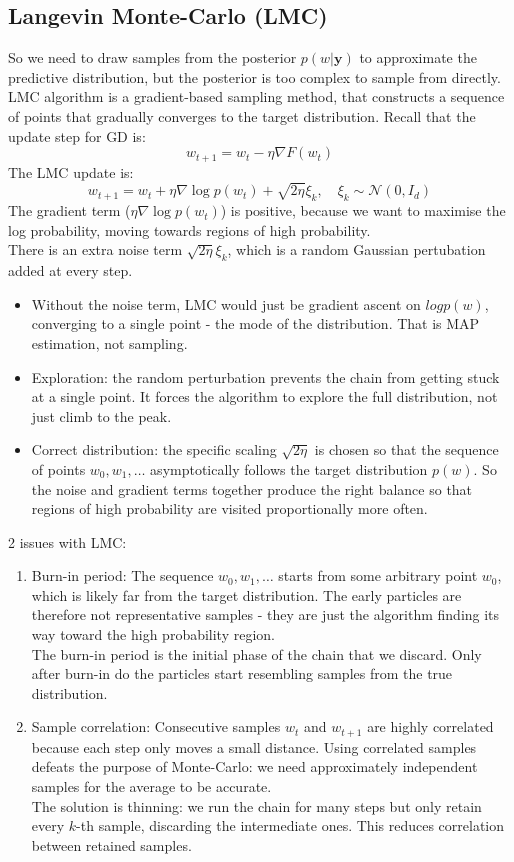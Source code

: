 \documentclass[../Probability.tex]{subfiles}
\begin{document}
\subsection{Langevin Monte-Carlo (LMC)}
So we need to draw samples from the posterior $p(w|\mathbf{y})$ to approximate the predictive distribution, but the posterior is too complex to sample from directly.
LMC algorithm is a gradient-based sampling method, that constructs a sequence of points that gradually converges to the target distribution.
Recall that the update step for GD is:
$$w_{t+1} = w_t - \eta\nabla F(w_t)$$
The LMC update is:
$$w_{t+1} = w_t + \eta\nabla\log p(w_t) + \sqrt{2\eta}\xi_k, \quad \xi_k \sim \mathcal{N}(0, I_d)$$
The gradient term ($\eta\nabla\log p(w_t)$) is positive, because we want to maximise the log probability, moving towards regions of high probability.\\
There is an extra noise term $\sqrt{2\eta}\xi_k$, which is a random Gaussian pertubation added at every step.
\begin{itemize}
    \item Without the noise term, LMC would just be gradient ascent on $log p(w)$, converging to a single point - the mode of the distribution. That is MAP estimation, not sampling.
    \item Exploration: the random perturbation prevents the chain from getting stuck at a single point. It forces the algorithm to explore the full distribution, not just climb to the peak.
    \item Correct distribution: the specific scaling $\sqrt{2\eta}$ is chosen so that the sequence of points $w_0,w_1,\ldots$ asymptotically follows the target distribution $p(w)$.
    So the noise and gradient terms together produce the right balance so that regions of high probability are visited proportionally more often.
\end{itemize}
2 issues with LMC:
\begin{enumerate}
    \item Burn-in period: The sequence $w_0, w_1, \ldots$ starts from some arbitrary point $w_0$, which is likely far from the target distribution.
    The early particles are therefore not representative samples - they are just the algorithm finding its way toward the high probability region.\\
    The burn-in period is the initial phase of the chain that we discard. Only after burn-in do the particles start resembling samples from the true distribution.
    \item Sample correlation: Consecutive samples $w_t$ and $w_{t+1}$ are highly correlated because each step only moves a small distance.
    Using correlated samples defeats the purpose of Monte-Carlo: we need approximately independent samples for the average to be accurate.\\
    The solution is thinning: we run the chain for many steps but only retain every $k$-th sample, discarding the intermediate ones. This reduces correlation between retained samples.

\end{enumerate}
\end{document}

